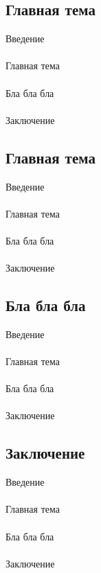 \documentclass{article}
\begin{document}
\begin{center}
\newpage
\section{Главная тема}
Введение\\
~\\
Главная тема\\
~\\
Бла бла бла\\
~\\
Заключение
\subsection{Главная тема}
Введение\\
~\\
Главная тема\\
~\\
Бла бла бла\\
~\\
Заключение
\subsection{Бла бла бла}
Введение\\
~\\
Главная тема\\
~\\
Бла бла бла\\
~\\
Заключение
\subsection{Заключение}
Введение\\
~\\
Главная тема\\
~\\
Бла бла бла\\
~\\
Заключение\\
~\\

\newpage


\end{center}
\end{document}
